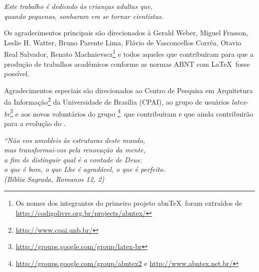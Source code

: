 \documentclass[
	12pt,				%
	openright,			%
    twoside,			%
	a4paper,			%
	english,			%
	french,				%
	spanish,			%
	brazil				%
	]{abntex2}
\numberwithin{lema}{chapter}
\numberwithin{teorema}{chapter}
\numberwithin{definicao}{chapter}
\numberwithin{figure}{chapter}
\begin{document}
\begin{dedicatoria}
   \vspace*{\fill}
   \centering
   \noindent
   \textit{ Este trabalho é dedicado às crianças adultas que,\\
   quando pequenas, sonharam em se tornar cientistas.} \vspace*{\fill}
\end{dedicatoria}

\begin{agradecimentos}[AGRADECIMENTOS]
Os agradecimentos principais são direcionados à Gerald Weber, Miguel Frasson,
Leslie H. Watter, Bruno Parente Lima, Flávio de Vasconcellos Corrêa, Otavio Real
Salvador, Renato Machnievscz\footnote{Os nomes dos integrantes do primeiro
projeto abn\TeX\ foram extraídos de
\url{http://codigolivre.org.br/projects/abntex/}} e todos aqueles que
contribuíram para que a produção de trabalhos acadêmicos conforme
as normas ABNT com \LaTeX\ fosse possível.

Agradecimentos especiais são direcionados ao Centro de Pesquisa em Arquitetura
da Informação\footnote{\url{http://www.cpai.unb.br/}} da Universidade de
Brasília (CPAI), ao grupo de usuários
\emph{latex-br}\footnote{\url{http://groups.google.com/group/latex-br}} e aos
novos voluntários do grupo
\emph{\abnTeX}\footnote{\url{http://groups.google.com/group/abntex2} e
\url{http://www.abntex.net.br/}}~que contribuíram e que ainda
contribuirão para a evolução do \abnTeX.

\end{agradecimentos}

\begin{epigrafe}
    \vspace*{\fill}
	\begin{flushright}
		\textit{``Não vos amoldeis às estruturas deste mundo, \\
		mas transformai-vos pela renovação da mente, \\
		a fim de distinguir qual é a vontade de Deus: \\
		o que é bom, o que Lhe é agradável, o que é perfeito.\\
		(Bíblia Sagrada, Romanos 12, 2)}
	\end{flushright}
\end{epigrafe}

\end{document}
